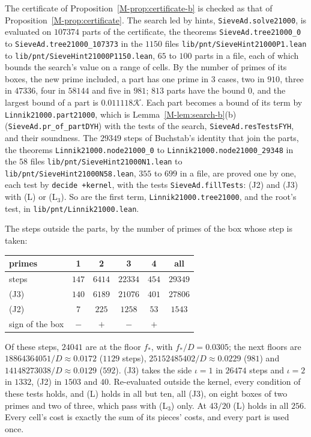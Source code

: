 \documentclass[11pt]{article}
\newcommand{\lean}[1]{\texttt{#1}}
\newcommand{\file}[1]{\nolinkurl{#1}}
\numberwithin{equation}{section}
\begin{document}
The certificate of Proposition~\ref{M-prop:certificate-b} is checked as that of Proposition~\ref{M-prop:certificate}.
The search led by hints, \lean{SieveAd.\allowbreak solve21000}, is evaluated on $107374$ parts of the certificate, the
theorems \lean{SieveAd.\allowbreak tree21000\_0} to
\lean{SieveAd.\allowbreak tree21000\_107373} in the $1150$ files \file{lib/pnt/SieveHint21000P1.lean} to
\file{lib/pnt/SieveHint21000P1150.lean}, $65$ to $100$ parts in a file, each of which bounds the search's value on a
range of cells. By the number of primes of its boxes, the new prime included, a part has one prime in $3$ cases, two
in $910$, three in $47336$, four in $58144$ and five in $981$; $813$ parts have the bound $0$, and the largest bound of
a part is $0.011118\mathcal K$. Each part becomes a bound of its term by \lean{Linnik21000.\allowbreak part21000},
which is Lemma~\ref{M-lem:search-b}(b) (\lean{SieveAd.\allowbreak pr\_of\_partDYH}) with the tests of the search,
\lean{SieveAd.\allowbreak resTestsFYH}, and their soundness. The $29349$ steps of Buchstab's identity that join the
parts, the theorems \lean{Linnik21000.\allowbreak node21000\_0} to \lean{Linnik21000.\allowbreak node21000\_29348} in
the $58$ files \file{lib/pnt/SieveHint21000N1.lean} to \file{lib/pnt/SieveHint21000N58.lean}, $355$ to $699$ in a file,
are proved one by one, each test by \lean{decide +kernel}, with the tests \lean{SieveAd.\allowbreak fillTests}: (J2)
and (J3) with (L) or (L$_3$). So are the first term, \lean{Linnik21000.\allowbreak tree21000}, and the root's
test, in \file{lib/pnt/Linnik21000.lean}.

The steps outside the parts, by the number of primes of the box whose step is taken:
\begin{center}
\small
\begin{tabular}{@{}lccccc@{}}
\toprule
primes & 1 & 2 & 3 & 4 & all \\
\midrule
steps & $147$ & $6414$ & $22334$ & $454$ & $29349$ \\
(J3) & $140$ & $6189$ & $21076$ & $401$ & $27806$ \\
(J2) & $7$ & $225$ & $1258$ & $53$ & $1543$ \\
sign of the box & $-$ & $+$ & $-$ & $+$ & \\
\bottomrule
\end{tabular}
\end{center}
Of these steps, $24041$ are at the floor $f_*$, with $f_*/D = 0.0305$; the next floors are
$18864364051/D \approx 0.0172$ ($1129$ steps), $25152485402/D \approx 0.0229$ ($981$) and
$14148273038/D \approx 0.0129$ ($592$). (J3) takes the side $\iota = 1$ in $26474$ steps and
$\iota = 2$ in $1332$, (J2) in $1503$
and $40$. Re-evaluated outside the kernel, every condition of these tests holds, and (L) holds in all but ten, all
(J3), on eight boxes of two primes and two of three, which pass with (L$_3$) only. At $43/20$ (L) holds in all $256$.
Every cell's cost is exactly the sum of its pieces' costs, and every part is used once.
\end{document}
